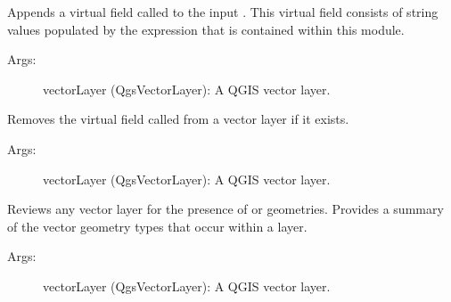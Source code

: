 \documentclass[a4paper,11pt,english]{sphinxmanual}
\begin{document}
\begin{fulllineitems}
\label{\detokenize{API:parseQGISGeometry.layerAddVirtualGeometryField}}
Appends a virtual field called  to the input .  This virtual field consists of string values populated by the  expression that is contained within this module.
\begin{description}
\item[{Args:}] \leavevmode
vectorLayer (QgsVectorLayer):  A QGIS vector layer.

\end{description}

\end{fulllineitems}


\begin{fulllineitems}
\label{\detokenize{API:parseQGISGeometry.layerRemoveVirtualGeometryField}}
Removes the virtual field called  from a vector layer if it exists.
\begin{description}
\item[{Args:}] \leavevmode
vectorLayer (QgsVectorLayer):  A QGIS vector layer.

\end{description}

\end{fulllineitems}


\begin{fulllineitems}
\label{\detokenize{API:parseQGISGeometry.layer_review}}

Reviews any vector layer for the presence of  or  geometries.  Provides a summary of the vector geometry types that occur within a layer.
\begin{description}
\item[{Args:}] \leavevmode
vectorLayer (QgsVectorLayer):  A QGIS vector layer.

\end{description}

\end{fulllineitems}
\end{document}
